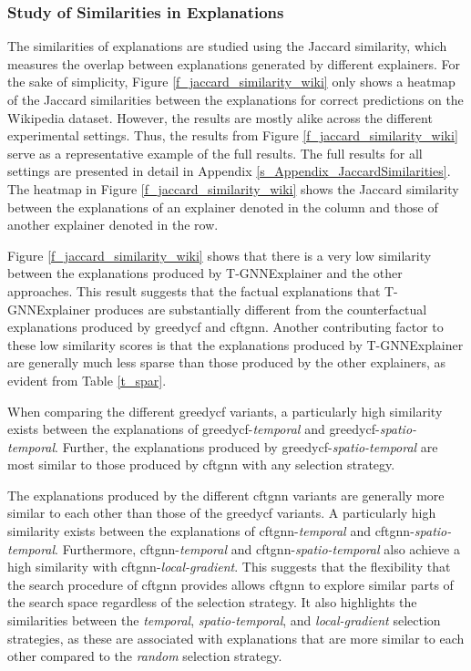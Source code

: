 \FloatBarrier
\subsubsection{Study of Similarities in Explanations}
\label{s_Evaluation_Results_Similarities}

The similarities of explanations are studied using the Jaccard similarity, which measures the overlap between explanations generated by different explainers. For the sake of simplicity, Figure \ref{f_jaccard_similarity_wiki} only shows a heatmap of the Jaccard similarities between the explanations for correct predictions on the Wikipedia dataset. However, the results are mostly alike across the different experimental settings. Thus, the results from Figure \ref{f_jaccard_similarity_wiki} serve as a representative example of the full results. The full results for all settings are presented in detail in Appendix \ref{s_Appendix_JaccardSimilarities}. The heatmap in Figure \ref{f_jaccard_similarity_wiki} shows the Jaccard similarity between the explanations of an explainer denoted in the column and those of another explainer denoted in the row.

Figure \ref{f_jaccard_similarity_wiki} shows that there is a very low similarity between the explanations produced by T-GNNExplainer and the other approaches. This result suggests that the factual explanations that T-GNNExplainer produces are substantially different from the counterfactual explanations produced by \gls{greedycf} and \gls{cftgnn}. Another contributing factor to these low similarity scores is that the explanations produced by T-GNNExplainer are generally much less sparse than those produced by the other explainers, as evident from Table \ref{t_spar}.

When comparing the different \gls{greedycf} variants, a particularly high similarity exists between the explanations of \gls{greedycf}-\textit{temporal} and \gls{greedycf}-\textit{spatio-temporal}. Further, the explanations produced by \gls{greedycf}-\textit{spatio-temporal} are most similar to those produced by \gls{cftgnn} with any selection strategy.

The explanations produced by the different \gls{cftgnn} variants are generally more similar to each other than those of the \gls{greedycf} variants. A particularly high similarity exists between the explanations of \gls{cftgnn}-\textit{temporal} and \gls{cftgnn}-\textit{spatio-temporal}. Furthermore, \gls{cftgnn}-\textit{temporal} and \gls{cftgnn}-\textit{spatio-temporal} also achieve a high similarity with \gls{cftgnn}-\textit{local-gradient}. This suggests that the flexibility that the search procedure of \gls{cftgnn} provides allows \gls{cftgnn} to explore similar parts of the search space regardless of the selection strategy. It also highlights the similarities between the \textit{temporal}, \textit{spatio-temporal}, and \textit{local-gradient} selection strategies, as these are associated with explanations that are more similar to each other compared to the \textit{random} selection strategy.


